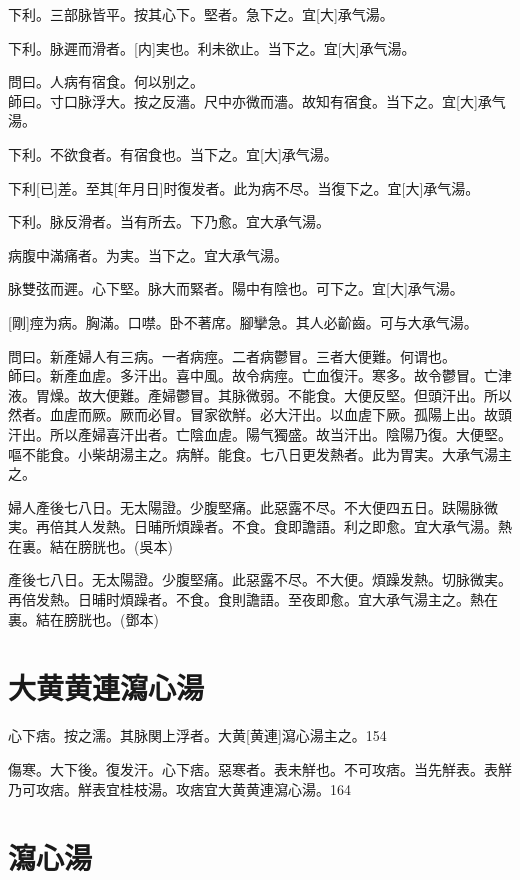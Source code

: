 \documentclass[12pt,twoside,UTF8,b5paper]{ctexbook}
\begin{document}
下利。三部脉皆平。按其心下。堅者。急下之。宜[大]承气湯。

下利。脉遲而滑者。[内]実也。利未欲止。当下之。宜[大]承气湯。

問曰。人病有宿食。何以别之。\\
師曰。寸口脉浮大。按之反濇。尺中亦微而濇。故知有宿食。当下之。宜[大]承气湯。

下利。不欲食者。有宿食也。当下之。宜[大]承气湯。

下利[已]差。至其[年月日]时復发者。此为病不尽。当復下之。宜[大]承气湯。

下利。脉反滑者。当有所去。下乃愈。宜大承气湯。

病腹中滿痛者。为実。当下之。宜大承气湯。

脉雙弦而遲。心下堅。脉大而緊者。陽中有陰也。可下之。宜[大]承气湯。

[剛]痙为病。胸滿。口噤。卧不著席。腳攣急。其人必齘齒。可与大承气湯。

問曰。新產婦人有三病。一者病痙。二者病鬱冒。三者大便難。何谓也。\\
師曰。新產血虗。多汗出。喜中風。故令病痙。亡血復汗。寒多。故令鬱冒。亡津液。胃燥。故大便難。產婦鬱冒。其脉微弱。不能食。大便反堅。但頭汗出。所以然者。血虗而厥。厥而必冒。冒家欲觧。必大汗出。以血虗下厥。孤陽上出。故頭汗出。所以產婦喜汗出者。亡陰血虗。陽气獨盛。故当汗出。陰陽乃復。大便堅。嘔不能食。小柴胡湯主之。病觧。能食。七八日更发熱者。此为胃実。大承气湯主之。

婦人產後七八日。无太陽證。少腹堅痛。此惡露不尽。不大便四五日。趺陽脉微実。再倍其人发熱。日晡所煩躁者。不食。食即譫語。利之即愈。宜大承气湯。熱在裏。結在膀胱也。(吳本)

產後七八日。无太陽證。少腹堅痛。此惡露不尽。不大便。煩躁发熱。切脉微実。再倍发熱。日晡时煩躁者。不食。食則譫語。至夜即愈。宜大承气湯主之。熱在裏。結在膀胱也。(鄧本)

\section{大黄黄連瀉心湯}

心下痞。按之濡。其脉関上浮者。大黄[黄連]瀉心湯主之。154

傷寒。大下後。復发汗。心下痞。惡寒者。表未觧也。不可攻痞。当先觧表。表觧乃可攻痞。觧表宜桂枝湯。攻痞宜大黄黄連瀉心湯。164

\section{瀉心湯}
\end{document}
